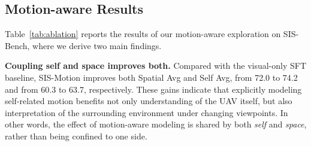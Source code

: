 \documentclass[sigconf, screen, review, anonymous]{acmart}
\begin{document}











\subsection{Motion-aware Results}

Table~\ref{tab:ablation} reports the results of our motion-aware exploration on SIS-Bench, where we derive two main findings.

\noindent \textbf{Coupling self and space improves both.}
Compared with the visual-only SFT baseline, SIS-Motion improves both Spatial Avg and Self Avg, from 72.0 to 74.2 and from 60.3 to 63.7, respectively. These gains indicate that explicitly modeling self-related motion benefits not only understanding of the UAV itself, but also interpretation of the surrounding environment under changing viewpoints. In other words, the effect of motion-aware modeling is shared by both \emph{self} and \emph{space}, rather than being confined to one side.
\end{document}
